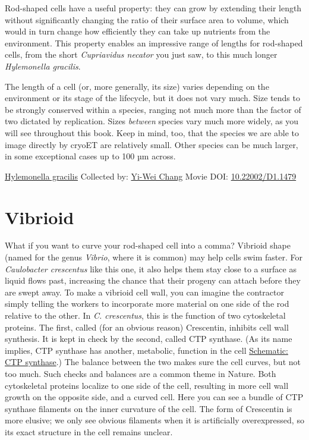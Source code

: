 \documentclass[]{tufte-book}
\begin{document}
Rod-shaped cells have a useful property: they can grow by extending their length without significantly changing the ratio of their surface area to volume, which would in turn change how efficiently they can take up nutrients from the environment. This property enables an impressive range of lengths for rod-shaped cells, from the short \emph{Cupriavidus necator} you just saw, to this much longer \emph{Hylemonella gracilis}.

The length of a cell (or, more generally, its size) varies depending on the environment or its stage of the lifecycle, but it does not vary much. Size tends to be strongly conserved within a species, ranging not much more than the factor of two dictated by replication. Sizes \emph{between} species vary much more widely, as you will see throughout this book. Keep in mind, too, that the species we are able to image directly by cryoET are relatively small. Other species can be much larger, in some exceptional cases up to 100 µm across.



\hypertarget{htmlwidget-245b248988c5737d9ab6}{}

\label{fig:3-3}\protect\hyperlink{tree}{Hylemonella gracilis} Collected by: \protect\hyperlink{yi-wei_chang}{Yi-Wei Chang} Movie DOI: \href{https://doi.org/10.22002/D1.1479}{10.22002/D1.1479}

\hypertarget{vibrioid}{%
\section{Vibrioid}\label{vibrioid}}

What if you want to curve your rod-shaped cell into a comma? Vibrioid shape (named for the genus \emph{Vibrio}, where it is common) may help cells swim faster. For \emph{Caulobacter crescentus} like this one, it also helps them stay close to a surface as liquid flows past, increasing the chance that their progeny can attach before they are swept away. To make a vibrioid cell wall, you can imagine the contractor simply telling the workers to incorporate more material on one side of the rod relative to the other. In \emph{C. crescentus}, this is the function of two cytoskeletal proteins. The first, called (for an obvious reason) Crescentin, inhibits cell wall synthesis. It is kept in check by the second, called CTP synthase. (As its name implies, CTP synthase has another, metabolic, function in the cell \protect\hyperlink{CTP_synthase}{Schematic: CTP synthase}.) The balance between the two makes sure the cell curves, but not too much. Such checks and balances are a common theme in Nature. Both cytoskeletal proteins localize to one side of the cell, resulting in more cell wall growth on the opposite side, and a curved cell. Here you can see a bundle of CTP synthase filaments on the inner curvature of the cell. The form of Crescentin is more elusive; we only see obvious filaments when it is artificially overexpressed, so its exact structure in the cell remains unclear.
\end{document}
